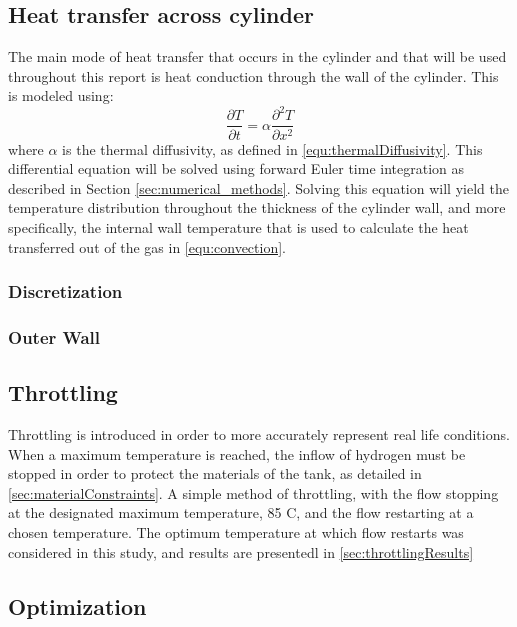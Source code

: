

\subsection{Heat transfer across cylinder}

The main mode of heat transfer that occurs in the cylinder and that will be used throughout this report is heat conduction through the wall of the cylinder. This is modeled using:
\begin{equation}
\frac{\partial T}{\partial t} = \alpha \frac{\partial^2 T }{\partial x^2}
\end{equation}
where $\alpha$ is the thermal diffusivity, as defined in \cref{equ:thermalDiffusivity}. This differential equation will be solved using forward Euler time integration as described in Section \ref{sec:numerical_methods}. Solving this equation will yield the temperature distribution throughout the thickness of the cylinder wall, and more specifically, the internal wall temperature that is used to calculate the heat transferred out of the gas in \cref{equ:convection}.


\subsubsection{Discretization}


\subsubsection{Outer Wall}




\subsection{Throttling}

Throttling is introduced in order to more accurately represent real life conditions. When a maximum temperature is reached, the inflow of hydrogen must be stopped in order to protect the materials of the tank, as detailed in \cref{sec:materialConstraints}. A simple method of throttling, with the flow stopping at the designated maximum temperature, 85 \degree C, and the flow restarting at a chosen temperature. The optimum temperature at which flow restarts was considered in this study, and results are presentedl in \cref{sec:throttlingResults}


\subsection{Optimization}

